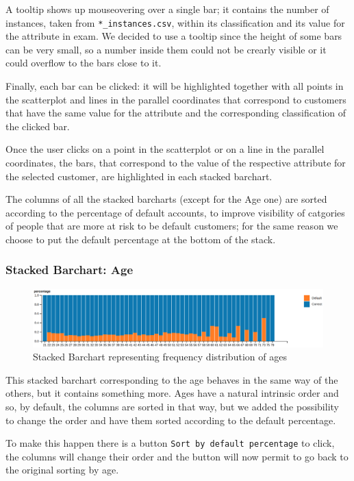 \documentclass[journal]{vgtc}                %
\begin{document}
A tooltip shows up mouseovering over a single bar; it contains the number of instances, taken from \texttt{*\_instances.csv}, within its classification and its value for the attribute in exam. We decided to use a tooltip since the height of some bars
can be very small, so a number inside them could not be crearly visible or it could overflow to the bars close to it.

Finally, each bar can be clicked: it will be highlighted together with all points in the scatterplot and lines in the parallel coordinates that correspond to customers
that have the same value for the attribute and the corresponding classification of the clicked bar.

Once the user clicks on a point in the scatterplot or on a line in the parallel coordinates, the bars, that correspond to the value of the respective attribute for the selected customer, are highlighted in each stacked barchart.

The columns of all the stacked barcharts (except for the Age one) are sorted according to the percentage of default accounts, to improve visibility of catgories of people that are more at risk to be default customers; for the same
reason we choose to put the default percentage at the bottom of the stack.

\subsubsection{Stacked Barchart: Age}
\begin{figure}[h]
  \centering
  \includegraphics[scale=0.13]{age}
  \caption{Stacked Barchart representing frequency distribution of ages}
  \label{age}
\end{figure}

This stacked barchart corresponding to the age behaves in the same way of the others, but it contains something more.
Ages have a natural intrinsic order and so, by default, the columns are sorted in that way, but we added the possibility
to change the order and have them sorted according to the default percentage.

To make this happen there is a button \texttt{Sort by default percentage} to click, the columns will change their order and
the button will now permit to go back to the original sorting by age.
\end{document}
